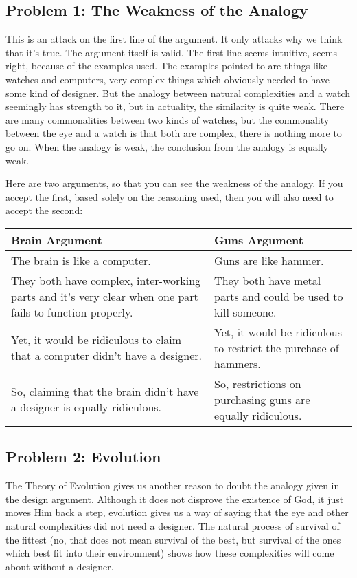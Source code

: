 \subsection{Problem 1: The Weakness of the Analogy}

This is an attack on the first line of the argument. It only attacks why we think that it’s true. The argument itself is valid. The first line seems intuitive, seems right, because of the examples used. The examples pointed to are things like watches and computers, very complex things which obviously needed to have some kind of designer. But the analogy between natural complexities and a watch seemingly has strength to it, but in actuality, the similarity is quite weak. There are many commonalities between two kinds of watches, but the commonality between the eye and a watch is that both are complex, there is nothing more to go on. When the analogy is weak, the conclusion from the analogy is equally weak.

Here are two arguments, so that you can see the weakness of the analogy. If you accept the first, based solely on the reasoning used, then you will also need to accept the second:


\noindent
\begin{tabular}{p{2.75in}|p{2.75in}}
Brain Argument&Guns Argument\\\hline
    The brain is like a computer.&Guns are like hammer.\\
    They both have complex, inter-working parts and it’s very clear when one part fails to function properly.&They both have metal parts and could be used to kill someone.\\
    Yet, it would be ridiculous to claim that a computer didn’t have a designer.&Yet, it would be ridiculous to restrict the purchase of hammers.\\
    So, claiming that the brain didn’t have a designer is equally ridiculous.&So, restrictions on purchasing guns are equally ridiculous.
\end{tabular}

\subsection{Problem 2: Evolution}

The Theory of Evolution gives us another reason to doubt the analogy given in the design argument. Although it does not disprove the existence of God, it just moves Him back a step, evolution gives us a way of saying that the eye and other natural complexities did not need a designer. The natural process of survival of the fittest (no, that does not mean survival of the best, but survival of the ones which best fit into their environment) shows how these complexities will come about without a designer.

